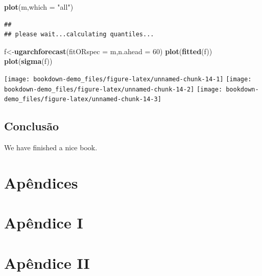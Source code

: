 \documentclass[
  12pt,
  a4paper,
  openany]{book}
\newenvironment{Shaded}{\begin{snugshade}}{\end{snugshade}}
\newcommand{\DataTypeTok}[1]{\textcolor[rgb]{0.13,0.29,0.53}{#1}}
\newcommand{\DecValTok}[1]{\textcolor[rgb]{0.00,0.00,0.81}{#1}}
\newcommand{\KeywordTok}[1]{\textcolor[rgb]{0.13,0.29,0.53}{\textbf{#1}}}
\newcommand{\NormalTok}[1]{#1}
\newcommand{\StringTok}[1]{\textcolor[rgb]{0.31,0.60,0.02}{#1}}
\begin{document}
\begin{Shaded}
\begin{Highlighting}[]
\KeywordTok{plot}\NormalTok{(m,}\DataTypeTok{which =} \StringTok{"all"}\NormalTok{)}
\end{Highlighting}
\end{Shaded}

\begin{verbatim}
## 
## please wait...calculating quantiles...
\end{verbatim}

\begin{Shaded}
\begin{Highlighting}[]
\NormalTok{f\textless{}{-}}\KeywordTok{ugarchforecast}\NormalTok{(}\DataTypeTok{fitORspec =}\NormalTok{ m,}\DataTypeTok{n.ahead =} \DecValTok{60}\NormalTok{)}
\KeywordTok{plot}\NormalTok{(}\KeywordTok{fitted}\NormalTok{(f))}
\KeywordTok{plot}\NormalTok{(}\KeywordTok{sigma}\NormalTok{(f))}
\end{Highlighting}
\end{Shaded}

\begin{center}\texttt{[image: bookdown-demo\_files/figure-latex/unnamed-chunk-14-1]} \texttt{[image: bookdown-demo\_files/figure-latex/unnamed-chunk-14-2]} \texttt{[image: bookdown-demo\_files/figure-latex/unnamed-chunk-14-3]} \end{center}

\hypertarget{conclusuxe3o}{%
\chapter*{Conclusão}\label{conclusuxe3o}}

We have finished a nice book.

  

\part*{Apêndices}

\newpage
\part*{\normalfont\huge\bfseries\centering Apêndice I}
\newpage

\part*{\normalfont\huge\bfseries\centering Apêndice II}
\newpage
\end{document}
